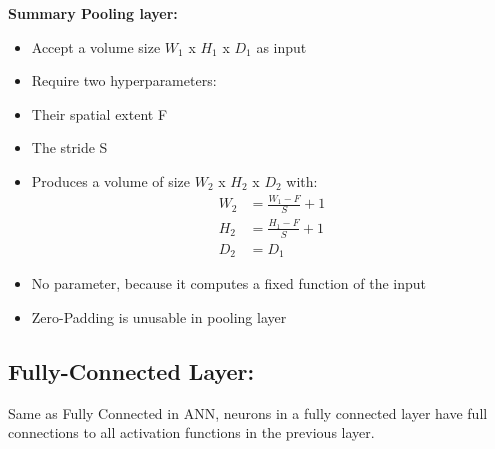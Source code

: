 \textbf{Summary Pooling layer:}
\begin{itemize}
	\item Accept a volume size $W_{1}$ x $H_{1}$ x $D_{1}$ as input
	\item Require two hyperparameters:
	\item Their spatial extent F 
	\item The stride S
	\item Produces a volume of size $W_{2}$ x $H_{2}$ x $D_{2}$ with:
	\begin{align*}
	W_{2} &= \frac{W_{1} - F }{S} + 1\\
	H_{2} &= \frac{H_{1} - F }{S} + 1\\
	D_{2} &= D_{1}
	\end{align*}
	\item No parameter, because it computes a fixed function of the input\\
	\item Zero-Padding is unusable in pooling layer
\end{itemize}



\subsection{Fully-Connected Layer:}
Same as Fully Connected in ANN, neurons in a fully connected layer have full connections to all activation functions in the previous layer. 

